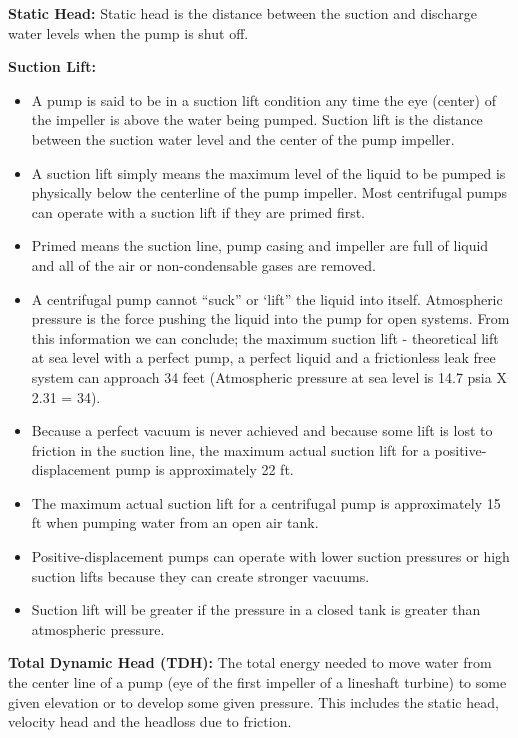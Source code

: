 \textbf{Static Head: }  Static head is the distance between the suction and discharge water levels when the pump is shut off. 

\textbf{Suction Lift: } 
\begin{itemize}
\item A pump is said to be in a suction lift condition any time the eye (center) of the impeller is above the water being pumped. Suction lift is the distance between the suction water level and the center of the pump impeller. 
\item A suction lift simply means the maximum level of the liquid to be pumped is physically below the centerline of the pump impeller. Most centrifugal pumps can operate with a suction lift if they are primed first. 
\item Primed means the suction line, pump casing and impeller are full of liquid and all of the air or non-condensable gases are removed. 
\item A centrifugal pump cannot “suck” or ‘lift” the liquid into itself. Atmospheric pressure is the force pushing the liquid into the pump for open systems. From this information we can conclude; the maximum suction lift - theoretical lift at sea level with a perfect pump, a perfect liquid and a frictionless leak free system can approach 34 feet (Atmospheric pressure at sea level is 14.7 psia X 2.31 = 34).\\
\item Because a perfect vacuum is never achieved and because some lift is lost to friction in the suction line, the maximum actual suction lift for a positive-displacement pump is approximately 22 ft. 
\item The maximum actual suction lift for a centrifugal pump  is approximately 15 ft when pumping water from an open air tank. 
\item Positive-displacement pumps can operate with lower suction pressures or high suction lifts because they can create stronger vacuums. 
\item Suction lift will be greater if the pressure in a closed tank is greater than atmospheric pressure.
\end{itemize}

\textbf{Total Dynamic Head (TDH):}  The total energy needed to move water from the center line of a pump (eye of the first impeller of a lineshaft turbine) to some given elevation or to develop some given pressure. This includes the static head, velocity head and the headloss due to friction. 

